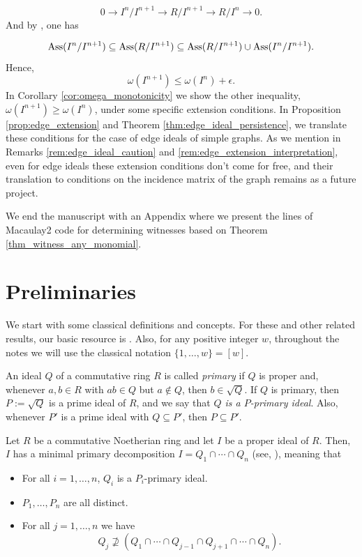 \documentclass[11pt]{amsart}   %
\begin{document}
$$0\longrightarrow I^n/I^{n+1}\longrightarrow R/I^{n+1}\longrightarrow R/I^n\longrightarrow 0.$$ And by \cite[Exercise 9.42]{Sh}, one has

$${\rm Ass}(I^n/I^{n+1})\subseteq {\rm Ass}(R/I^{n+1})\subseteq {\rm Ass}(R/I^{n+1})\cup {\rm Ass}(I^n/I^{n+1}).$$ Hence, $$\omega(I^{n+1})\leq \omega(I^n)+\epsilon.$$ In Corollary \ref{cor:omega_monotonicity} we show the other inequality, $\omega(I^{n+1})\geq \omega(I^n)$, under some specific extension conditions. In Proposition \ref{prop:edge_extension} and Theorem \ref{thm:edge_ideal_persistence}, we translate these conditions for the case of edge ideals of simple graphs. As we mention in Remarks \ref{rem:edge_ideal_caution} and  \ref{rem:edge_extension_interpretation}, even for edge ideals these extension conditions don't come for free, and  their translation to conditions on the incidence matrix of the graph remains as a future project.

We end the manuscript with an Appendix where we present the lines of Macaulay2 code for determining witnesses based on Theorem \ref{thm_witness_any_monomial}.

\section{Preliminaries}\label{sec_preliminaries}

We start with some classical definitions and concepts. For these and other related results, our basic resource is \cite{Sh}. Also, for any positive integer $w$, throughout the notes we will use the classical notation $\{1,\ldots,w\}=[w]$.

An ideal $Q$ of a commutative ring $R$  is called {\em primary} if $Q$ is proper and, whenever $a,b\in R$ with $ab\in Q$ but $a\notin Q$, then $b\in \sqrt{Q}$. If $Q$ is primary, then $P:=\sqrt{Q}$ is a prime ideal of $R$, and we say that {\em $Q$ is a $P$-primary ideal}. Also, whenever $P'$ is a prime ideal with $Q\subseteq P'$, then $P\subseteq P'$.

Let $R$ be a commutative Noetherian ring and let $I$ be a proper ideal of $R$. Then, $I$ has a minimal primary decomposition $I=Q_1\cap\cdots\cap Q_n$ (see, \cite[Corollary 4.35]{Sh}), meaning that
\begin{itemize}
  \item[(a)] For all $i=1,\ldots,n$, $Q_i$ is a $P_i$-primary ideal.
  \item[(b)] $P_1,\ldots, P_n$ are all distinct.
  \item[(c)] For all $j=1,\ldots,n$ we have $$Q_j\nsupseteq (Q_1\cap\cdots\cap Q_{j-1}\cap Q_{j+1}\cap\cdots\cap Q_n).$$
\end{itemize}
\end{document}
